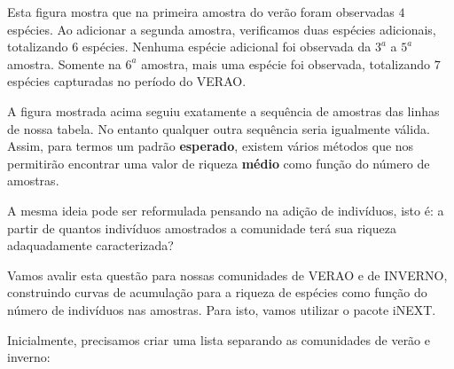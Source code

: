 \documentclass[
]{book}
\newenvironment{Shaded}{\begin{snugshade}}{\end{snugshade}}
\newcommand{\FunctionTok}[1]{\textcolor[rgb]{0.00,0.00,0.00}{#1}}
\newcommand{\NormalTok}[1]{#1}
\newcommand{\OtherTok}[1]{\textcolor[rgb]{0.56,0.35,0.01}{#1}}
\newcommand{\SpecialCharTok}[1]{\textcolor[rgb]{0.00,0.00,0.00}{#1}}
\newcommand{\StringTok}[1]{\textcolor[rgb]{0.31,0.60,0.02}{#1}}
\begin{document}
Esta figura mostra que na primeira amostra do verão foram observadas \(4\) espécies. Ao adicionar a segunda amostra, verificamos duas espécies adicionais, totalizando \(6\) espécies. Nenhuma espécie adicional foi observada da \(3^a\) a \(5^a\) amostra. Somente na \(6^a\) amostra, mais uma espécie foi observada, totalizando \(7\) espécies capturadas no período do VERAO.

A figura mostrada acima seguiu exatamente a sequência de amostras das linhas de nossa tabela. No entanto qualquer outra sequência seria igualmente válida. Assim, para termos um padrão \textbf{esperado}, existem vários métodos que nos permitirão encontrar uma valor de riqueza \textbf{médio} como função do número de amostras.

A mesma ideia pode ser reformulada pensando na adição de indivíduos, isto é: a partir de quantos indivíduos amostrados a comunidade terá sua riqueza adaquadamente caracterizada?

Vamos avalir esta questão para nossas comunidades de VERAO e de INVERNO, construindo curvas de acumulação para a riqueza de espécies como função do número de indivíduos nas amostras. Para isto, vamos utilizar o pacote iNEXT.

Inicialmente, precisamos criar uma lista separando as comunidades de verão e inverno:

\begin{Shaded}
\end{Shaded}
\end{document}
